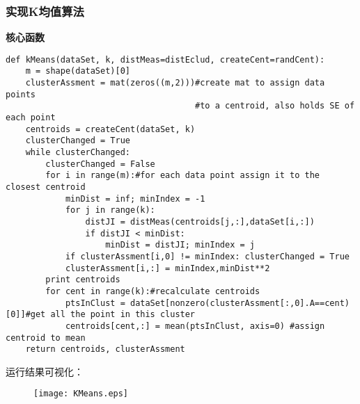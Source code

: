 \subsubsection{实现K均值算法}
\noindent\textbf{核心函数}
\begin{lstlisting}
def kMeans(dataSet, k, distMeas=distEclud, createCent=randCent):
    m = shape(dataSet)[0]
    clusterAssment = mat(zeros((m,2)))#create mat to assign data points
                                      #to a centroid, also holds SE of each point
    centroids = createCent(dataSet, k)
    clusterChanged = True
    while clusterChanged:
        clusterChanged = False
        for i in range(m):#for each data point assign it to the closest centroid
            minDist = inf; minIndex = -1
            for j in range(k):
                distJI = distMeas(centroids[j,:],dataSet[i,:])
                if distJI < minDist:
                    minDist = distJI; minIndex = j
            if clusterAssment[i,0] != minIndex: clusterChanged = True
            clusterAssment[i,:] = minIndex,minDist**2
        print centroids
        for cent in range(k):#recalculate centroids
            ptsInClust = dataSet[nonzero(clusterAssment[:,0].A==cent)[0]]#get all the point in this cluster
            centroids[cent,:] = mean(ptsInClust, axis=0) #assign centroid to mean
    return centroids, clusterAssment
\end{lstlisting}

\newpage
\noindent 运行结果可视化：
\begin{figure}[h]
  \centering
  \texttt{[image: KMeans.eps]}
\end{figure}






